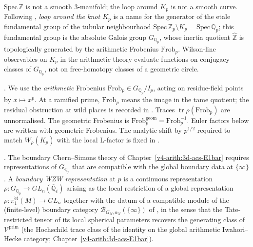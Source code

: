 \begin{remark}
\label{v4-arith:w9-r1:rem:no-geometric-loop}
\(\mathrm{Spec}\,\mathbb Z\) is not a smooth 3-manifold; the loop around
\(K_{p}\) is not a smooth curve. Following
, \emph{loop around the knot
\(K_{p}\)} is a name for the generator of the etale fundamental group of
the tubular neighbourhood
\(\mathrm{Spec}\,\mathbb Z_{p}\setminus K_{p}=
\mathrm{Spec}\,\mathbb Q_{p}\); this fundamental group is the absolute
Galois group \(G_{\mathbb Q_{p}}\), whose inertia
quotient \(\widehat{\mathbb Z}\) is topologically generated by the
arithmetic Frobenius \(\mathrm{Frob}_{p}\). Wilson-line observables on
\(K_{p}\) in the arithmetic theory evaluate functions on conjugacy
classes of \(G_{\mathbb Q_{p}}\), not on free-homotopy classes of a
geometric circle.
\end{remark}

\begin{convention}
\label{v4-arith:w9-r1:conv:frob}
\ClaimStatusDefinitional. We use the \emph{arithmetic} Frobenius
\(\mathrm{Frob}_{p}\in G_{\mathbb Q_{p}}/I_{p}\), acting on residue-field
points by \(x\mapsto x^{p}\). At a ramified prime, \(\mathrm{Frob}_{p}\)
means the image in the tame quotient; the residual obstruction at wild
places is recorded in . Traces
\(\operatorname{tr}\rho(\mathrm{Frob}_{p})\) are unnormalised. The
geometric Frobenius is
\(\mathrm{Frob}_{p}^{\mathrm{geom}}=\mathrm{Frob}_{p}^{-1}\). Euler
factors below are written with geometric Frobenius. The
analytic shift by \(p^{1/2}\) required to match
\(W_{\rho}(K_{p})\) with the local L-factor is fixed in
.
\end{convention}

\begin{definition}
\label{v4-arith:w9-r1:def:boundary-rep}
\ClaimStatusDefinitional. The boundary Chern--Simons theory of
Chapter~\ref{v4-arith:3d-acs-E1bar} requires representations of
\(G_{\mathbb Q_{p}}\) that are compatible with the global boundary data
at \(\{\infty\}\). A \emph{boundary WZW representation} at \(p\) is a
continuous representation
\(\rho\colon G_{\mathbb Q_{p}}\to GL_{n}(\overline{\mathbb Q}_{\ell})\)
arising as the local restriction of a global representation
\(\rho\colon\pi_{1}^{\mathrm{\acute et}}(M)\to GL_{n}\) together with the
datum of a compatible module of the (finite-level) boundary category
\(\mathcal B_{G_{N},\alpha_{N}}(\{\infty\})\) of
, in the sense that
the Tate-restricted tensor of its local spherical parameters recovers
the generating class of
\(\mathcal V^{\mathrm{prim}}\) (the Hochschild trace class of the identity
on the global arithmetic Iwahori--Hecke category;
Chapter~\ref{v4-arith:3d-acs-E1bar}).
\end{definition}

